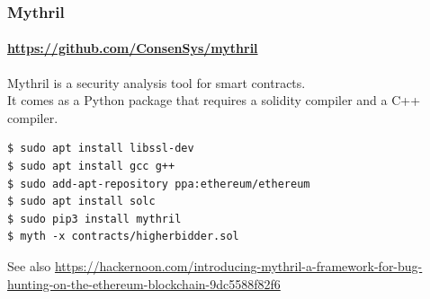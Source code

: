 

\begin{frame}[fragile]
	\frametitle{Mythril}
	\framesubtitle{\url{https://github.com/ConsenSys/mythril}}
	Mythril is a security analysis tool for smart contracts.\\
	It comes as a Python package that requires a solidity compiler and a C++ compiler.
	\vspace{1em}
	\begin{Verbatim}[fontsize=\tiny]
$ sudo apt install libssl-dev
$ sudo apt install gcc g++
$ sudo add-apt-repository ppa:ethereum/ethereum
$ sudo apt install solc
$ sudo pip3 install mythril 
$ myth -x contracts/higherbidder.sol 
	\end{Verbatim}
	\vspace{3em}
	{\footnotesize See also \url{https://hackernoon.com/introducing-mythril-a-framework-for-bug-hunting-on-the-ethereum-blockchain-9dc5588f82f6}}
\end{frame}

